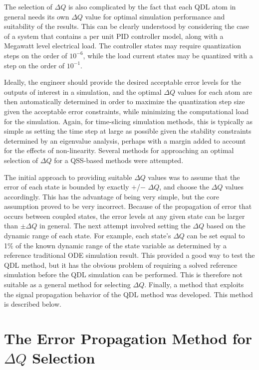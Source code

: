 The selection of $\Delta Q$ is also complicated by the fact that each QDL atom in general needs its own $\Delta Q$ value for optimal simulation performance and suitability of the results. This can be clearly understood by considering the case of a system that contains a per unit PID controller model, along with a Megawatt level electrical load. The controller states may require quantization steps on the order of $10^{-6}$, while the load current states may be quantized with a step on the order of $10^{-1}$. 

Ideally, the engineer should provide the desired acceptable error levels for the outputs of interest in a simulation, and the optimal $\Delta Q$ values for each atom are then automatically determined in order to maximize the quantization step size given the acceptable error constraints, while minimizing the computational load for the simulation. Again, for time-slicing simulation methods, this is typically as simple as setting the time step at large as possible given the stability constraints determined by an eigenvalue analysis, perhaps with a margin added to account for the effects of non-linearity. Several methods for approaching an optimal selection of $\Delta Q$ for a QSS-based methods were attempted.

The initial approach to providing suitable $\Delta Q$ values was to assume that the error of each state is bounded by exactly $+$/$-$ $\Delta Q$, and choose the $\Delta Q$ values accordingly. This has the advantage of being very simple, but the core assumption proved to be very incorrect. Because of the propagation of error that occurs between coupled states, the error levels at any given state can be larger than $\pm \Delta Q$ in general. The next attempt involved setting the $\Delta Q$ based on the dynamic range of each state. For example, each state's $\Delta Q$ can be set equal to 1\% of the known dynamic range of the state variable as determined by a reference traditional ODE simulation result. This provided a good way to test the QDL method, but it has the obvious problem of requiring a solved reference simulation before the QDL simulation can be performed. This is therefore not suitable as a general method for selecting $\Delta Q$. Finally, a method that exploits the signal propagation behavior of the QDL method was developed. This method is described below.

\section{The Error Propagation Method for $\Delta Q$ Selection}

